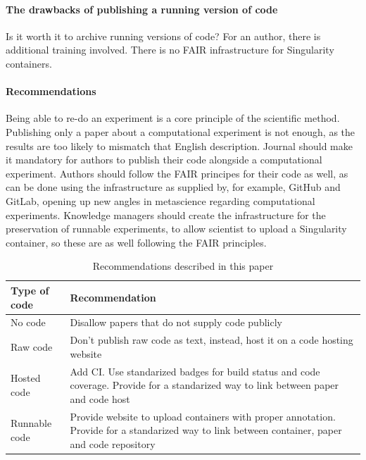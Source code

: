 \paragraph{The drawbacks of publishing a running version of code}

Is it worth it to archive running versions of code?
For an author, 
there is additional training involved.
There is no FAIR infrastructure for Singularity containers.

\paragraph{Recommendations}

Being able to re-do an experiment is a core principle of the scientific method.
Publishing only a paper about a computational experiment is not enough,
as the results are too likely to mismatch that English description.
Journal should make it mandatory for authors
to publish their code alongside a computational experiment.
Authors should follow the FAIR principes for their code as well,
as can be done using the infrastructure as supplied by, 
for example, GitHub and GitLab, opening up new angles in
metascience regarding computational experiments.
Knowledge managers should create the infrastructure for the preservation
of runnable experiments, to allow scientist to upload a Singularity
container, so these are as well following the FAIR principles.

\begin{table}[h]
  \begin{tabular}{|l|p{9cm}|}
    \hline
    \textbf{Type of code} & \textbf{Recommendation} \\
    \hline
    No code       & Disallow papers that do not supply code publicly \\
    \hline
    Raw code      & Don't publish raw code as text, instead, host it on a code hosting website \\
    \hline
    Hosted code   & Add CI. Use standarized badges for build status and code coverage. 
                    Provide for a standarized way to link between paper and code host \\
    \hline
    Runnable code & Provide website to upload containers with proper annotation.
                    Provide for a standarized way to link between container, paper and code repository \\
    \hline
  \end{tabular}
  \caption{Recommendations described in this paper}
  \label{tab:recommendations}
\end{table}

